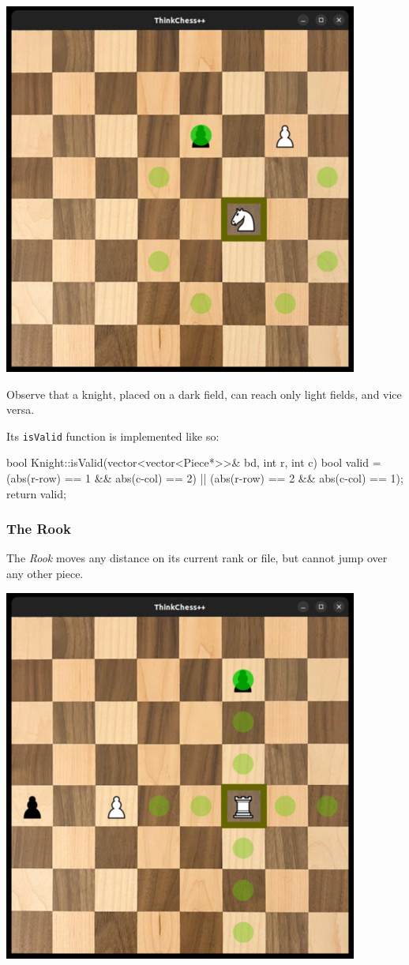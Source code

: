 \begin{center}
\includegraphics[width=.5\linewidth]{img/knight.jpg}
\end{center}

Observe that a knight, placed on a dark field, can reach only light fields, and vice versa.

Its \texttt{isValid} function is implemented like so:

\begin{cpp}
bool Knight::isValid(vector<vector<Piece*>>& bd, int r, int c) {
  bool valid = (abs(r-row) == 1 && abs(c-col) == 2) ||
               (abs(r-row) == 2 && abs(c-col) == 1);
  return valid;
}
\end{cpp}

\subsubsection{The Rook}
The \emph{Rook} moves any distance on its current rank or file, but cannot jump over any other piece.

\begin{center}
\includegraphics[width=.5\linewidth]{img/rook.jpg}
\end{center}

